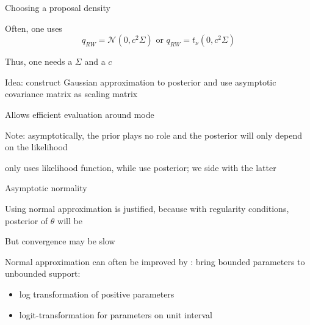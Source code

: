 \begin{frame}{Choosing a proposal density}
\begin{witemize}
    \item Often, one uses
    \begin{equation}
    q_{RW}=\mathcal{N}(0,c^2\Sigma) \text{ or } q_{RW}=t_\nu(0,c^2\Sigma)
    \end{equation}
    \item Thus, one needs a  $\Sigma$ and a  $c$
    \item Idea: construct Gaussian approximation to posterior and use asymptotic covariance matrix as scaling matrix
    \item Allows efficient evaluation around mode
    \item Note: asymptotically, the prior plays no role and the posterior will only depend on the likelihood
    \item \textcite{Koop2003} only uses likelihood function, while \textcite{AnSchorfheide2007} use posterior; we side with the latter
\end{witemize}
\end{frame}

\begin{frame}{Asymptotic normality}
\begin{witemize}
    \item Using normal approximation is justified, because with regularity conditions, posterior of $\theta $ will be  \parencite[see e.g.][]{Walker1969,Kim1998,Crowder1998}
    \item But convergence may be slow
    \item Normal approximation can often be improved by  \parencite{Adolfsonetal2007}: bring bounded parameters to unbounded support:
    \begin{itemize}
      \item log transformation of positive parameters
      \item logit-transformation for parameters on unit interval
    \end{itemize}

\end{witemize}
\end{frame}

